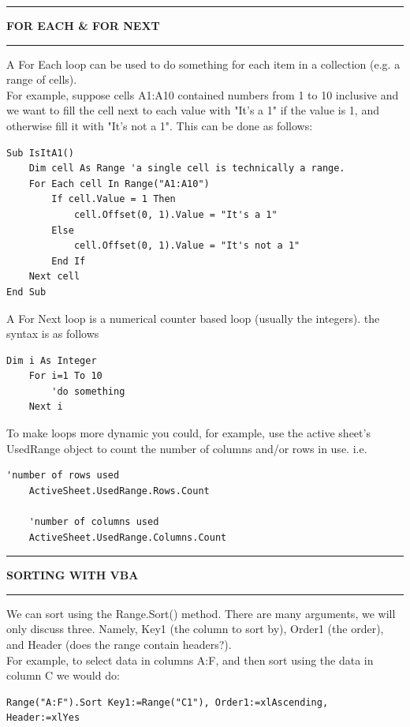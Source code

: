 \documentclass[8pt]{extarticle}
\newcommand{\heading}[1]{%
    \noindent
    \rule{\linewidth}{0.4pt}
    \begin{center}
        \vspace{-1ex}
        \textbf{#1}        
        \vspace{-2.5ex}
    \end{center}
    \rule{\linewidth}{0.4pt}
}
\begin{document}
\begin{multicols}{3}
\heading{FOR EACH \& FOR NEXT}

A For Each loop can be used to do something for each item in a collection (e.g. a range of cells). \\

For example, suppose cells A1:A10 contained numbers from 1 to 10 inclusive and we want to fill the cell next to each value with "It's a 1" if the value is 1, and otherwise fill it with "It's not a 1". This can be done as follows:

\begin{lstlisting}[style=vba]
Sub IsItA1()
    Dim cell As Range 'a single cell is technically a range.
    For Each cell In Range("A1:A10")
        If cell.Value = 1 Then
            cell.Offset(0, 1).Value = "It's a 1"
        Else
            cell.Offset(0, 1).Value = "It's not a 1"
        End If
    Next cell
End Sub
\end{lstlisting}

A For Next loop is a numerical counter based loop (usually the integers). the syntax is as follows

\begin{lstlisting}[style=vba]
    Dim i As Integer
    For i=1 To 10 
        'do something
    Next i
\end{lstlisting}

To make loops more dynamic you could, for example, use the active sheet's UsedRange object to count the number of columns and/or rows in use. i.e.
\begin{lstlisting}[style=vba]
    'number of rows used
    ActiveSheet.UsedRange.Rows.Count
    
    'number of columns used
    ActiveSheet.UsedRange.Columns.Count    
\end{lstlisting}

\columnbreak
\heading{SORTING WITH VBA}

We can sort using the Range.Sort() method. There are many arguments, we will only discuss three. Namely, Key1 (the column to sort by), Order1 (the order), and Header (does the range contain headers?).\\

For example, to select data in columns A:F, and then sort using the data in column C we would do:

\begin{lstlisting}[style=vba]
    Range("A:F").Sort Key1:=Range("C1"), Order1:=xlAscending, Header:=xlYes   
\end{lstlisting}


\end{multicols}
\end{document}
